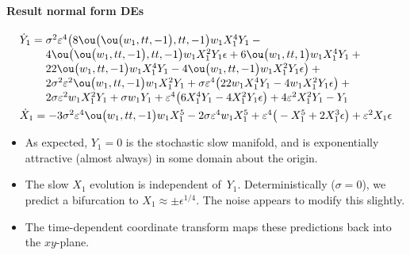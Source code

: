 \paragraph{Result normal form DEs}
\begin{align*}&
\dot Y_{1}=\ParMath{\sigma ^{2} \eps^{4} \big(8 \ou\big(\ou\big(w_{1},tt,-1\big),
tt,-1\big) w_{1} X_{1}^{4} Y_{1}-4 \ou\big(\ou\big(w_{1},tt,-1\big),tt,
-1\big) w_{1} X_{1}^{2} Y_{1} \epsilon +6 \ou\big(w_{1},tt,1\big) w_{1} 
X_{1}^{4} Y_{1}+22 \ou\big(w_{1},tt,-1\big) w_{1} X_{1}^{4} Y_{1}-4 \ou
\big(w_{1},tt,-1\big) w_{1} X_{1}^{2} Y_{1} \epsilon \big)+2 \sigma ^{2}
 \eps^{2} \ou\big(w_{1},tt,-1\big) w_{1} X_{1}^{2} Y_{1}+\sigma  \eps^{4
} \big(22 w_{1} X_{1}^{4} Y_{1}-4 w_{1} X_{1}^{2} Y_{1} \epsilon \big)+2
 \sigma  \eps^{2} w_{1} X_{1}^{2} Y_{1}+\sigma  w_{1} Y_{1}+\eps^{4} 
\big(6 X_{1}^{4} Y_{1}-4 X_{1}^{2} Y_{1} \epsilon \big)+4 \eps^{2} X_{1}
^{2} Y_{1}-Y_{1}
}
\\&
\dot X_{1}=\ParMath{-3 \sigma ^{2} \eps^{4} \ou\big(w_{1},tt,-1\big) w_{1} X_{1}
^{5}-2 \sigma  \eps^{4} w_{1} X_{1}^{5}+\eps^{4} \big(-X_{1}^{5}+2 X_{1}
^{3} \epsilon \big)+\eps^{2} X_{1} \epsilon 
}
\end{align*}
\begin{itemize}
\item As expected, \(Y_1=0\) is the stochastic slow manifold, and is exponentially attractive (almost always) in some domain about the origin.
\item The slow \(X_1\) evolution is independent of~\(Y_1\).  
Deterministically (\(\sigma=0\)), we predict a bifurcation to \(X_1\approx \pm\epsilon^{1/4}\).  The noise appears to modify this slightly.
\item The time-dependent coordinate transform maps these predictions back into the \(xy\)-plane.
\end{itemize}


